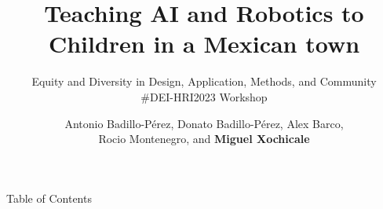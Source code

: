 \documentclass[xcolor={dvipsnames},aspectratio=169,10pt]{beamer}
\title{
Teaching AI and Robotics to Children in a Mexican town
}
\subtitle{
Equity and Diversity in Design, Application, Methods, and Community \\
\#DEI-HRI2023 Workshop 
}
\author{
Antonio Badillo-P\'erez,
Donato Badillo-P\'erez, 
Alex Barco, \\ 
Rocio Montenegro, and
{\bf Miguel Xochicale}
}
\date{
}
\institute{
	\faEnvelope \space  air4children@gmail.com \\
	\faGithubAlt \space @air4children \faTwitter \space @air4children  
		}
\begin{document}
\maketitle

\begin{frame}{Table of Contents}
    \tableofcontents
\end{frame}








\maketitle
\end{document}
